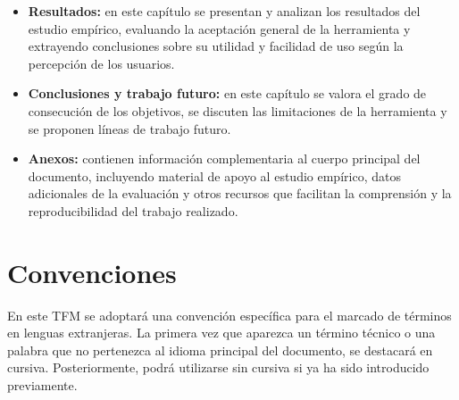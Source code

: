 \begin{itemize}
    \item[$\bullet$] \textbf{Resultados:} en este capítulo se presentan y analizan los resultados del estudio empírico,  evaluando la aceptación general de la herramienta y extrayendo conclusiones sobre su utilidad y facilidad de uso según la percepción de los usuarios.

    \item[$\bullet$] \textbf{Conclusiones y trabajo futuro:} en este capítulo se valora el grado de consecución de los objetivos, se discuten las limitaciones de la herramienta y se proponen líneas de trabajo futuro.

    \item[$\bullet$] \textbf{Anexos:} contienen información complementaria al cuerpo principal del documento, incluyendo material de apoyo al estudio empírico, datos adicionales de la evaluación y otros recursos que facilitan la comprensión y la reproducibilidad del trabajo realizado.
\end{itemize}

\section{Convenciones}

En este TFM se adoptará una convención específica para el marcado de términos en lenguas extranjeras. La primera vez que aparezca un término técnico o una palabra que no pertenezca al idioma principal del documento, se destacará en cursiva. Posteriormente, podrá utilizarse sin cursiva si ya ha sido introducido previamente.

